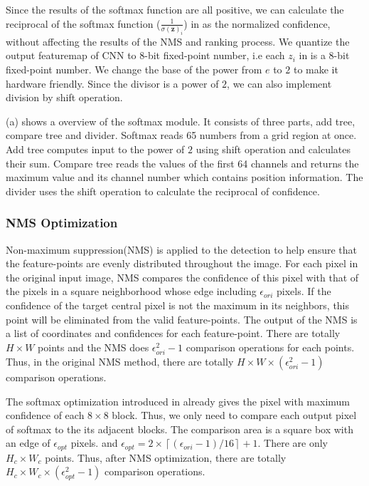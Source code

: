 Since the results of the softmax function are all positive, we can calculate the reciprocal of the softmax function ($\frac{1}{\sigma (\mathbf {z} )_{i}}$) in  as the normalized confidence, without affecting the results of the NMS and ranking process. We quantize the output featuremap of CNN to 8-bit fixed-point number, i.e each $z_i$ in  is a 8-bit fixed-point number. We change the base of the power from $e$ to $2$ to make it hardware friendly. Since the divisor is a power of $2$, we can also implement division by shift operation.

(a) shows a overview of the softmax module. It consists of three parts, add tree, compare tree and divider. Softmax reads 65 numbers from a grid region at once. Add tree computes input to the power of $2$ using shift operation and calculates their sum. Compare tree reads the values of the first 64 channels and returns the maximum value and its channel number which contains position information. The divider uses the shift operation to calculate the reciprocal of confidence.

\subsubsection{NMS Optimization}

Non-maximum suppression(NMS) is applied to the detection to help ensure that the feature-points are evenly distributed throughout the image. 
For each pixel in the original input image, NMS compares the confidence of this pixel with that of the pixels in a square neighborhood whose edge including $\epsilon _{ori}$ pixels. 
If the confidence of the target central pixel is not the maximum in its neighbors, this point will be eliminated from the valid feature-points. 
The output of the NMS is a list of coordinates and confidences for each feature-point. 
There are totally $H \times W$ points and the NMS does $\epsilon _{ori} ^ 2 - 1$ comparison operations for each points. 
Thus, in the original NMS method, there are totally $H \times W \times (\epsilon _{ori} ^ 2 - 1)$ comparison operations.

The softmax optimization introduced in  already gives the pixel with maximum confidence of each $8 \times 8$ block. Thus, we only need to compare each output pixel of softmax to the its adjacent blocks. The comparison area is a square box with an edge of $\epsilon _{opt}$ pixels. and $\epsilon _{opt} = 2\times \left \lceil (\epsilon _{ori}-1)/16 \right \rceil +1$. There are only $H_c \times W_c$ points. Thus, after NMS optimization, there are totally $H_c \times W_c \times (\epsilon _{opt} ^ 2 - 1)$ comparison operations.

